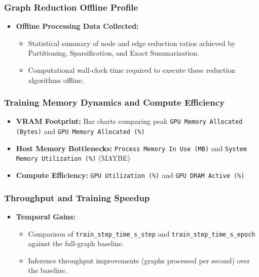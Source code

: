 \documentclass[paper=a4, fontsize=11pt]{scrartcl} %
\numberwithin{equation}{section} %
\numberwithin{figure}{section} %
\numberwithin{table}{section} %
\begin{document}
\subsubsection{Graph Reduction Offline Profile}
\begin{itemize}
    \item \textbf{Offline Processing Data Collected:} 
    \begin{itemize}
        \item Statistical summary of node and edge reduction ratios achieved by Partitioning, Sparsification, and Exact Summarization.
        \item Computational wall-clock time required to execute these reduction algorithms offline.
    \end{itemize}
\end{itemize}

\subsubsection{Training Memory Dynamics and Compute Efficiency}
\begin{itemize}
    \item \textbf{VRAM Footprint:} Bar charts comparing peak \texttt{GPU Memory Allocated (Bytes)} and \texttt{GPU Memory Allocated (\%)} 
    \item \textbf{Host Memory Bottlenecks:} \texttt{Process Memory In Use (MB)} and \texttt{System Memory Utilization (\%)}  (MAYBE)
    \item \textbf{Compute Efficiency:} \texttt{GPU Utilization (\%)} and \texttt{GPU DRAM Active (\%)} 
\end{itemize}


\subsubsection{Throughput and Training Speedup}
\begin{itemize}
    \item \textbf{Temporal Gains:} 
    \begin{itemize}
        \item Comparison of \texttt{train\_step\_time\_s\_step} and \texttt{train\_step\_time\_s\_epoch} against the full-graph baseline.
        \item Inference throughput improvements (graphs processed per second) over the baseline.
    \end{itemize}
\end{itemize}
\end{document}
